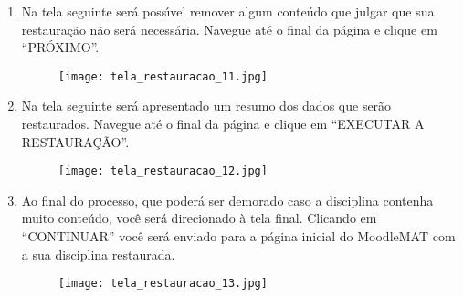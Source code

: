 \documentclass[12pt]{report}
\begin{document}
\begin{enumerate}[\bf 1)]
  	\newpage

	\item Na tela seguinte ser\'a poss{\'\i}vel remover algum conte\'udo que julgar que sua restaura\c{c}\~ao n\~ao ser\'a necess\'aria. Navegue at\'e o final da p\'agina e clique em ``PR\'OXIMO''.
	\begin{figure}[H]
    	\centering
    	\hspace*{-2.5cm}\texttt{[image: tela\_restauracao\_11.jpg]}
  	\end{figure}

	\newpage

	\item Na tela seguinte ser\'a apresentado um resumo dos dados que ser\~ao restaurados. Navegue at\'e o final da p\'agina e clique em ``EXECUTAR A RESTAURA\c{C}\~AO''.
	\begin{figure}[H]
    	\centering
    	\hspace*{-2.5cm}\texttt{[image: tela\_restauracao\_12.jpg]}
  	\end{figure}

	\newpage

	\item Ao final do processo, que poder\'a ser demorado caso a disciplina contenha muito conte\'udo, voc\^e ser\'a direcionado \`a tela final. Clicando em ``CONTINUAR'' voc\^e ser\'a enviado para a p\'agina inicial do MoodleMAT com a sua disciplina restaurada.
	\begin{figure}[H]
    	\centering
    	\hspace*{-2.5cm}\texttt{[image: tela\_restauracao\_13.jpg]}
  	\end{figure}
\end{enumerate}
\end{document}
